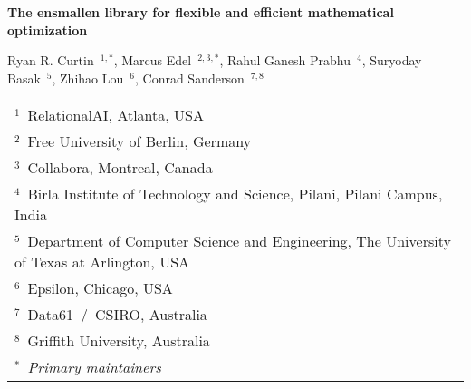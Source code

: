 \documentclass[10pt]{article}
\begin{document}
\pagestyle{empty}

\begin{center}

{\Large\bf The ensmallen library for flexible and efficient mathematical optimization}




\vspace{1.5ex}
Ryan R. Curtin{\tiny~}{$^{1,*}$}, 
Marcus Edel{\tiny~}{$^{2,3,*}$}, 
Rahul Ganesh Prabhu{\tiny~}{$^{4}$}, 
Suryoday Basak{\tiny~}{$^{5}$},
Zhihao Lou{\tiny~}{$^{6}$}, 
Conrad Sanderson{\tiny~}{$^{7,8}$}
\vspace{1.5ex}


\begin{small}
\begin{tabular}{l}
$^{1}$~RelationalAI, Atlanta, USA\\
$^{2}$~Free University of Berlin, Germany\\
$^{3}$~Collabora, Montreal, Canada\\
$^{4}$~Birla Institute of Technology and Science, Pilani, Pilani Campus, India\\
$^{5}$~Department of Computer Science and Engineering, The University of Texas at Arlington, USA\\
$^{6}$~Epsilon, Chicago, USA\\
$^{7}$~Data61~/~CSIRO, Australia\\
$^{8}$~Griffith University, Australia\\
$^{*}$~{\it Primary maintainers}
\end{tabular}
\end{small}

\end{center}
\end{document}
